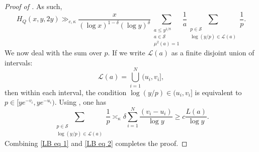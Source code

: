 \documentclass{amsart}
\theoremstyle{definition}
\numberwithin{equation}{section}
\renewcommand{\S}{\mathcal{S}}
\renewcommand{\L}{\mathscr{L}}
\newcommand{\density}{\delta}
\begin{document}
\begin{proof}[Proof of ]
		As such,
		\begin{equation} \label{LB eq 1}
			H_Q(x,y,2y) \gg_{c,\kappa} \frac{x}{(\log x)^{1-\delta}(\log y)^\delta} \sum_{\substack{a \leq y^{1/8} \\ a \in \S \\ \mu^2(a) = 1}} \frac{1}{a} \sum_{\substack{p \in \S \\ \log(y/p)\in \L(a)}} \frac{1}{p}.
		\end{equation}
		We now deal with the sum over $p$. If we write $\L(a)$ as a finite disjoint union of intervals: $$\L(a) = \bigcup_{i = 1}^N (u_i,v_i],$$ then within each interval, the condition $\log(y/p) \in (u_i,v_i]$ is equivalent to $p \in [ye^{-v_i},ye^{-u_i}).$ Using , one has
		\begin{equation}\label{LB eq 2}
			\sum_{\substack{p \in \S \\ \log(y/p) \in \L(a)}} \frac{1}{p} \asymp_\kappa \density \sum_{i = 1}^{N}\frac{(v_i-u_i)}{\log y} \geq  c\frac{L(a)}{\log y}.
		\end{equation}
		Combining \eqref{LB eq 1} and \eqref{LB eq 2} completes the proof.
	\end{proof}
	
\end{document}
